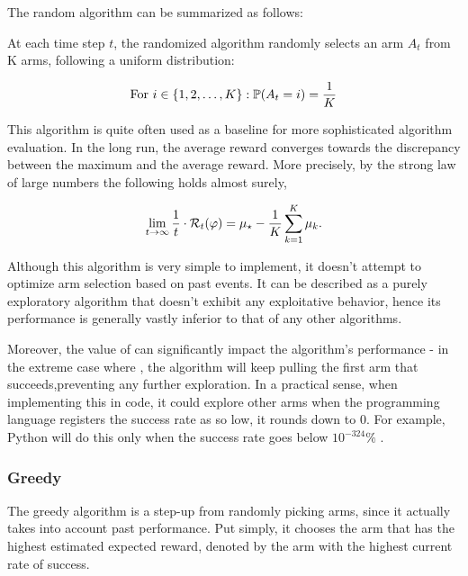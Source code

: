 The random algorithm can be summarized as follows:


At each time step $t$, the randomized algorithm randomly selects an arm $A_t$ from K arms, following a uniform distribution:

$$\text{For } i \in \{1, 2, \ldots, K\}: \mathbb{P}(A_t = i) = \frac{1}{K}$$

This algorithm is quite often used as a baseline for more sophisticated algorithm evaluation. In the long run, the average reward converges towards the discrepancy between the maximum and the average reward. More precisely, by the strong law of large numbers the following holds almost surely,

$$\lim_{{t \to \infty}} \frac{1}{t}\cdot \mathcal{R}_{t}(\varphi) = \mu_{\star}-\frac{1}{K} \sum_{{k=1}}^{K} \mu_{k}.$$

Although this algorithm is very simple to implement, it doesn't attempt to optimize arm selection based on past events. It can be described as a purely exploratory algorithm that doesn't exhibit any exploitative behavior, hence its performance is generally vastly inferior to that of any other algorithms.

Moreover, the value of \actionValueEstimate \space can significantly impact the algorithm's performance - in the extreme case where , the algorithm will keep pulling the first arm that succeeds,preventing any further exploration.
In a practical sense, when implementing this in code, it could explore other arms when the programming language registers the success rate as so low, it rounds down to 0.
For example, Python will do this only when the success rate goes below $10^{-324}\%$ \cite{python_min_float}.

\subsubsection{Greedy}
\label{sec:Greedy}
The greedy algorithm is a step-up from randomly picking arms, since it actually takes into account past performance. Put simply, it chooses the arm that has the highest estimated expected reward, denoted by the arm with the highest current rate of success.


